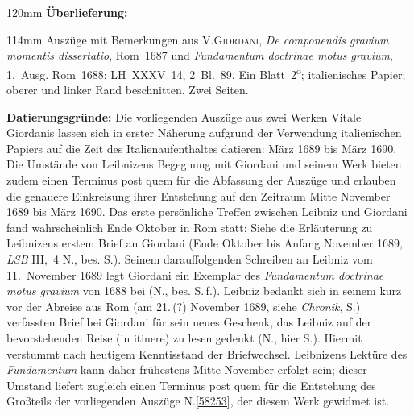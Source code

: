 
\begin{ledgroupsized}[r]{120mm}
\footnotesize
\pstart
\noindent\textbf{Überlieferung:}
\pend
\end{ledgroupsized}
\begin{ledgroupsized}[r]{114mm}
\footnotesize
\pstart
\parindent -6mm
%
Auszüge mit Bemerkungen aus
\textsc{V.\;Giordani}, 
\cite{02110}\textit{De componendis gravium momentis dissertatio}, Rom~1687 und 
\cite{02109}\textit{Fundamentum doctrinae motus gravium}, 1.~Ausg. Rom~1688: 
LH~XXXV~14, 2~Bl.~89. 
Ein Blatt~2\textsuperscript{o};
italienisches Papier;
oberer und linker Rand beschnitten. 
Zwei Seiten.
\pend
\end{ledgroupsized}
\vspace{5mm}
\begin{ledgroup}
\footnotesize
\pstart
\noindent
\textbf{Datierungsgründe:}
Die vorliegenden Auszüge aus zwei Werken Vitale Giordanis lassen sich
in erster Näherung
aufgrund der Verwendung italienischen Papiers auf die Zeit des Italienaufenthaltes datieren: März 1689 bis März 1690.
Die Umstände von Leibnizens Begegnung mit Giordani und seinem Werk bieten zudem einen Terminus post quem für die Abfassung der Auszüge und erlauben die genauere Einkreisung ihrer Entstehung auf den Zeitraum Mitte November 1689 bis März 1690.
\pend
\pstart
Das erste persönliche Treffen zwischen Leibniz und Giordani fand wahrscheinlich Ende Oktober in Rom statt: 
Siehe die Erläuterung zu Leibnizens erstem \cite{02119}Brief an Giordani (Ende Oktober bis Anfang November 1689, \textit{LSB} III,~4 N., bes. S.).
Seinem darauffolgenden \cite{02120}Schreiben an Leibniz vom 11.~November 1689 legt Giordani ein Exemplar des \cite{02109}\textit{Fundamentum doctrinae motus gravium} von 1688 bei (N., bes. S.\,f.).
Leibniz bedankt sich in seinem kurz vor der Abreise aus Rom (am 21.\,(?) November 1689, siehe \cite{01236}\textit{Chronik}, S.) 
verfassten \cite{02121}Brief 
bei Giordani
für sein \glqq neues Geschenk\grqq, das Leibniz auf der bevorstehenden Reise (\glqq in itinere\grqq) zu lesen gedenkt (N., hier S.). 
Hiermit verstummt nach heutigem Kenntisstand der Briefwechsel.
Leibnizens Lektüre des \cite{02109}\textit{Fundamentum} kann daher frühestens Mitte November erfolgt sein; dieser Umstand liefert zugleich einen Terminus post quem für die Entstehung des Großteils der vorliegenden Auszüge N.\;\ref{58253}, der diesem Werk gewidmet ist.

\end{ledgroup}
